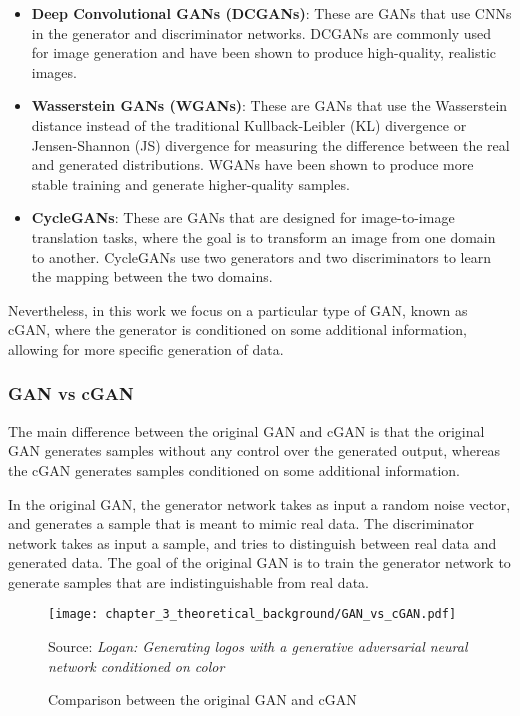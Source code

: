\begin{itemize}
	\item \textbf{Deep Convolutional GANs (DCGANs)}: These are \acp{GAN} that use \acp{CNN} in the generator and discriminator networks. DCGANs are commonly used for image generation and have been shown to produce high-quality, realistic images.
	\item \textbf{Wasserstein GANs (WGANs)}: These are \acp{GAN} that use the Wasserstein distance instead of the traditional Kullback-Leibler (KL) divergence or Jensen-Shannon (JS) divergence for measuring the difference between the real and generated distributions. WGANs have been shown to produce more stable training and generate higher-quality samples.
	\item \textbf{CycleGANs}: These are \acp{GAN} that are designed for image-to-image translation tasks, where the goal is to transform an image from one domain to another. CycleGANs use two generators and two discriminators to learn the mapping between the two domains.
\end{itemize}

Nevertheless, in this work we focus on a particular type of \ac{GAN}, known as \acf{cGAN}, where the generator is conditioned on some additional information, allowing for more specific generation of data. 

\subsubsection{GAN vs cGAN}
\label{subsubsec:3_cGAN}

The main difference between the original \acf{GAN} and \acf{cGAN} is that the original \ac{GAN} generates samples without any control over the generated output, whereas the \ac{cGAN} generates samples conditioned on some additional information.

In the original \ac{GAN}, the generator network takes as input a random noise vector, and generates a sample that is meant to mimic real data. The discriminator network takes as input a sample, and tries to distinguish between real data and generated data. The goal of the original \ac{GAN} is to train the generator network to generate samples that are indistinguishable from real data.

\begin{figure}[h]
	\centering
	\texttt{[image: chapter\_3\_theoretical\_background/GAN\_vs\_cGAN.pdf]}
	\caption{Comparison between the original \ac{GAN} and \ac{cGAN}}
	Source: \textit{Logan: Generating logos with a generative adversarial neural network conditioned on color} \cite{mino2018logan}
	\label{fig:chapter_3_theoretical_background/GAN_vs_cGAN}
\end{figure}

